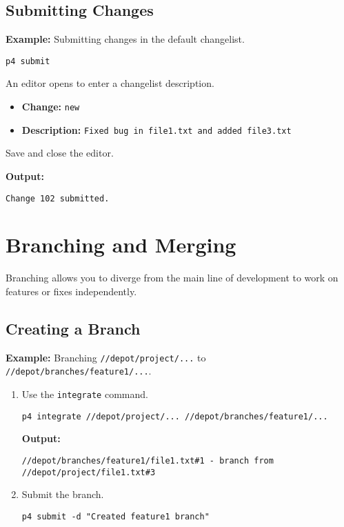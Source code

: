 \documentclass{article}
\begin{document}
\subsection{Submitting Changes}

\textbf{Example:} Submitting changes in the default changelist.

\begin{lstlisting}[style=bash]
p4 submit
\end{lstlisting}

An editor opens to enter a changelist description.

\begin{itemize}
    \item \textbf{Change:} \texttt{new}
    \item \textbf{Description:} \texttt{Fixed bug in file1.txt and added file3.txt}
\end{itemize}

Save and close the editor.

\textbf{Output:}

\begin{verbatim}
Change 102 submitted.
\end{verbatim}

\section{Branching and Merging}

Branching allows you to diverge from the main line of development to work on features or fixes independently.

\subsection{Creating a Branch}

\textbf{Example:} Branching \texttt{//depot/project/...} to \texttt{//depot/branches/feature1/...}.

\begin{enumerate}
    \item Use the \texttt{integrate} command.

\begin{lstlisting}[style=bash]
p4 integrate //depot/project/... //depot/branches/feature1/...
\end{lstlisting}

    \textbf{Output:}

\begin{verbatim}
//depot/branches/feature1/file1.txt#1 - branch from //depot/project/file1.txt#3
\end{verbatim}

    \item Submit the branch.

\begin{lstlisting}[style=bash]
p4 submit -d "Created feature1 branch"
\end{lstlisting}
\end{enumerate}
\end{document}
